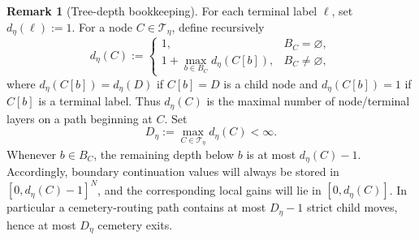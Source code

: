 \documentclass[12pt]{article}
\theoremstyle{definition}
\newtheorem{remark}[theorem]{Remark}
\newcommand{\1}{\mathbf{1}}
\newcommand{\cT}{\mathcal{T}}
\begin{document}
\begin{remark}[Tree-depth bookkeeping]
\label{rem:tree-depth}
For each terminal label $\ell$, set $d_\eta(\ell):=1$. For a node $C\in\cT_\eta$,
define recursively
\[
d_\eta(C)
:=
\begin{cases}
1, & B_C=\varnothing,\\[0.3em]
1+\max_{b\in B_C} d_\eta(C[b]), & B_C\neq \varnothing,
\end{cases}
\]
where $d_\eta(C[b])=d_\eta(D)$ if $C[b]=D$ is a child node and
$d_\eta(C[b])=1$ if $C[b]$ is a terminal label. Thus $d_\eta(C)$ is the maximal
number of node/terminal layers on a path beginning at $C$. Set
\[
D_\eta:=\max_{C\in\cT_\eta} d_\eta(C)<\infty.
\]
Whenever $b\in B_C$, the remaining depth below $b$ is at most $d_\eta(C)-1$.
Accordingly, boundary continuation values will always be stored in
$[0,d_\eta(C)-1]^N$, and the corresponding local gains will lie in
$[0,d_\eta(C)]$. In particular a cemetery-routing path contains at most
$D_\eta-1$ strict child moves, hence at most $D_\eta$ cemetery exits.
\end{remark}
\end{document}
